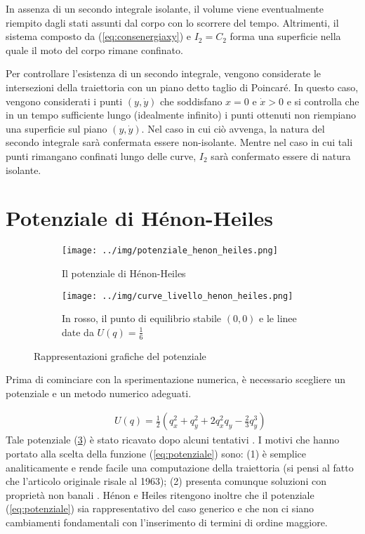\documentclass[a4paper, 12pt]{article}
\numberwithin{equation}{section}
\numberwithin{figure}{section}
\begin{document}
In assenza di un secondo integrale isolante, il volume viene eventualmente riempito
dagli stati assunti dal corpo con lo scorrere del tempo.
Altrimenti, il sistema composto da (\ref{eq:consenergiaxy}) e $I_2 = C_2$ forma una
superficie nella quale il moto del corpo rimane confinato.

Per controllare l'esistenza di un secondo integrale, vengono considerate le intersezioni della
traiettoria con un piano detto taglio di Poincaré. In questo caso, vengono considerati i punti
$(y,\dot{y})$ che soddisfano $x=0$ e $\dot{x}>0$ e si controlla che in un tempo sufficiente lungo
(idealmente infinito) i punti ottenuti non riempiano una superficie sul piano $(y,\dot{y})$. Nel
caso in cui ciò avvenga, la natura del secondo integrale sarà confermata essere non-isolante. Mentre
nel caso in cui tali punti rimangano confinati lungo delle curve, $I_2$ sarà confermato essere di natura
isolante.

\section{Potenziale di Hénon-Heiles}

\begin{figure}[h!]
	\centering
	\begin{subfigure}[t]{.5\textwidth}
		\centering
		\texttt{[image: ../img/potenziale\_henon\_heiles.png]}
		\caption{Il potenziale di Hénon-Heiles}
		\label{img:potenziale3d}
	\end{subfigure}%
	\begin{subfigure}[t]{.5\textwidth}
		\centering
		\texttt{[image: ../img/curve\_livello\_henon\_heiles.png]}
		\caption{In rosso, il punto di equilibrio stabile $(0,0)$ e le linee date da
		$U(q)=\frac{1}{6}$} 
		\label{img:curvelivello}
	\end{subfigure}
	\caption{Rappresentazioni grafiche del potenziale}
	\label{img:potenzialehh}
\end{figure}

Prima di cominciare con la sperimentazione numerica, è necessario scegliere un potenziale e un
metodo numerico adeguati.

\begin{eqnarray}	
	&&U(q) = \frac{1}{2}(q_x^2+q_y^2+2q_x^2q_y-\frac{2}{3}q_y^3) \label{eq:potenziale}
\end{eqnarray}
Tale potenziale (\ref{img:potenzialehh}) è stato ricavato dopo alcuni tentativi
\cite{1964henonheiles}.
I motivi che hanno portato alla scelta della funzione (\ref{eq:potenziale}) sono: (1)
è semplice analiticamente e rende facile una computazione della traiettoria (si pensi al fatto
che l'articolo originale risale al 1963);
(2) presenta comunque soluzioni con proprietà non banali \cite{hairer}. 
Hénon e Heiles ritengono inoltre che il potenziale (\ref{eq:potenziale}) sia rappresentativo del caso
generico e che non ci siano cambiamenti fondamentali con l'inserimento di termini di ordine maggiore.
\end{document}

